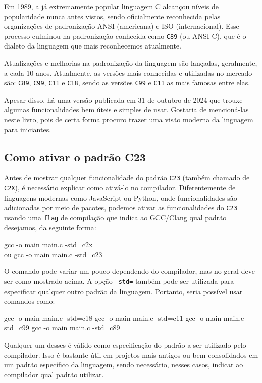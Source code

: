 Em 1989, a já extremamente popular linguagem C alcançou níveis de popularidade 
nunca antes vistos, sendo oficialmente reconhecida pelas organizações de 
padronização ANSI (americana) e ISO (internacional). Esse processo culminou na 
padronização conhecida como \texttt{C89} (ou ANSI C), que é o dialeto da 
linguagem que mais reconhecemos atualmente.

Atualizações e melhorias na padronização da linguagem são lançadas, geralmente, 
a cada 10 anos. Atualmente, as versões mais conhecidas e utilizadas no mercado 
são: \texttt{C89}, \texttt{C99}, \texttt{C11} e \texttt{C18}, sendo as versões 
\texttt{C99} e \texttt{C11} as mais famosas entre elas.

Apesar disso, há uma versão publicada em 31 de outubro de 2024 que trouxe 
algumas funcionalidades bem úteis e simples de usar. Gostaria de mencioná-las 
neste livro, pois de certa forma procuro trazer uma visão moderna da linguagem 
para iniciantes.

\subsection{Como ativar o padrão C23}

Antes de mostrar qualquer funcionalidade do padrão \texttt{C23} (também chamado 
de \texttt{C2X}), é necessário explicar como ativá-lo no compilador. 
Diferentemente de linguagens modernas como JavaScript ou Python, onde 
funcionalidades são adicionadas por meio de pacotes, podemos ativar as 
funcionalidades do \texttt{C23} usando uma \texttt{flag} de compilação que 
indica ao GCC/Clang qual padrão desejamos, da seguinte forma:

\begin{textbox}
    gcc -o main main.c -std=c2x
    \\ ou
    gcc -o main main.c -std=c23
\end{textbox}

O comando pode variar um pouco dependendo do compilador, mas no geral deve ser 
como mostrado acima. A opção \texttt{-std=} também pode ser utilizada para 
especificar qualquer outro padrão da linguagem. Portanto, seria possível usar 
comandos como:

\begin{textbox}
    gcc -o main main.c -std=c18
    gcc -o main main.c -std=c11
    gcc -o main main.c -std=c99
    gcc -o main main.c -std=c89
\end{textbox}

Qualquer um desses é válido como especificação do padrão a ser utilizado pelo 
compilador. Isso é bastante útil em projetos mais antigos ou bem consolidados em 
um padrão específico da linguagem, sendo necessário, nesses casos, indicar ao 
compilador qual padrão utilizar.

